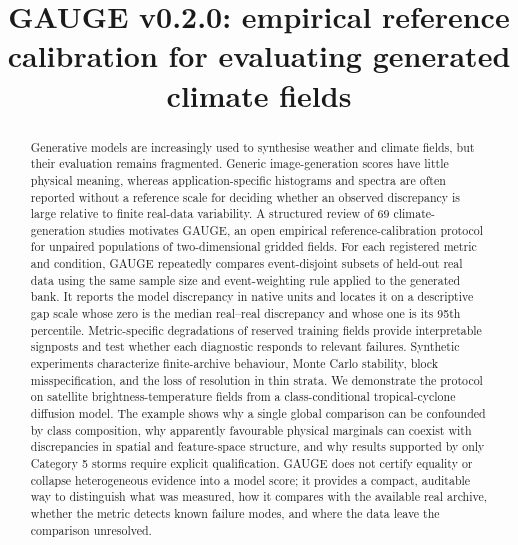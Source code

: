 \documentclass[gmd, manuscript]{copernicus}
\begin{document}


\title{GAUGE v0.2.0: empirical reference calibration for evaluating generated climate fields}




\received{}
\pubdiscuss{}
\revised{}
\accepted{}
\published{}

\maketitle

\begin{abstract}
Generative models are increasingly used to synthesise weather and climate fields,
but their evaluation remains fragmented. Generic image-generation scores have little
physical meaning, whereas application-specific histograms and spectra are often
reported without a reference scale for deciding whether an observed discrepancy is
large relative to finite real-data variability. A structured review of 69
climate-generation studies motivates GAUGE, an open empirical reference-calibration
protocol for unpaired populations of two-dimensional gridded fields. For each
registered metric and condition, GAUGE repeatedly compares event-disjoint subsets of
held-out real data using the same sample size and event-weighting rule applied to the
generated bank. It reports the model discrepancy in native units and locates it on a
descriptive gap scale whose zero is the median real--real discrepancy and whose one is
its 95th percentile. Metric-specific degradations of reserved training fields provide
interpretable signposts and test whether each diagnostic responds to relevant
failures. Synthetic experiments characterize finite-archive behaviour, Monte Carlo
stability, block misspecification, and the loss of resolution in thin strata. We
demonstrate the protocol on \GeneratedTotal{} satellite brightness-temperature fields from a
class-conditional tropical-cyclone diffusion model. The example shows why a single
global comparison can be confounded by class composition, why apparently favourable
physical marginals can coexist with discrepancies in spatial and feature-space
structure, and why results supported by only \CfiveStorms{} Category 5 storms require explicit
qualification. GAUGE does not certify equality or collapse heterogeneous evidence
into a model score; it provides a compact, auditable way to distinguish what was
measured, how it compares with the available real archive, whether the metric detects
known failure modes, and where the data leave the comparison unresolved.
\end{abstract}
\end{document}

